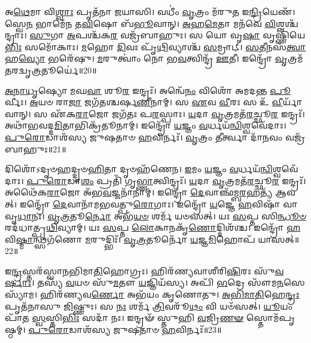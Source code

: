 𑌅\-\ul{𑌥𑍇}\-𑌮𑌾 𑌵𑌿\-\ul{𑌶𑍍𑌵𑌾𑌃} 𑌪𑍃𑌤᳴𑌨𑌾 𑌜𑌯𑌾𑌸𑌿।
𑌵𑌧𑍀𑌂॑ \ul{𑌵𑍃}\-𑌤𑍍𑌰𑌂 𑌮᳴𑌰𑍁𑌤 𑌇\-\ul{𑌨𑍍𑌦𑍍𑌰𑌿}\-𑌯𑍇𑌣᳴।
𑌸𑍍𑌵𑍇\-\ul{𑌨} 𑌭𑌾𑌮𑍇᳴𑌨 𑌤\-\ul{𑌵𑌿}\-𑌷𑍋 𑌬᳴\-\ul{𑌭𑍂}\-𑌵𑌾𑌨𑍍।
\-\ul{𑌅}\-𑌹\-\ul{𑌮𑍇}\-𑌤𑌾 𑌮𑌨᳴𑌵𑍇 \ul{𑌵𑌿}\-𑌶𑍍𑌵𑌶𑍍𑌚᳴𑌨𑍍𑌦𑍍𑌰𑌾𑌃।
\-\ul{𑌸𑍁}\-𑌗𑌾 \ul{𑌅}\-𑌪𑌶𑍍𑌚᳴𑌕\-\ul{𑌰} 𑌵𑌜𑍍𑌰᳴𑌬𑌾𑌹𑍁𑌃।
𑌸 𑌯𑍋 𑌵𑍃\-\ul{𑌷𑌾} 𑌵𑍃𑌷𑍍𑌣𑌿᳴𑌯𑍇\-\ul{𑌭𑌿𑌃} 𑌸𑌮𑍋᳴𑌕𑌾𑌃।
\-\ul{𑌮}\-𑌹𑍋 \ul{𑌦𑌿}\-𑌵𑌃 𑌪𑍃᳴\-\ul{𑌥𑌿}\-𑌵𑍍𑌯𑌾𑌶𑍍𑌚᳴ \ul{𑌸}\-𑌮𑍍𑌰𑌾𑌟𑍍।
\-\ul{𑌸}\-\-\ul{𑌤𑍀}\-𑌨𑌸᳴\-\ul{𑌤𑍍𑌵𑌾} 𑌹\-\ul{𑌵𑍍𑌯𑍋} 𑌭𑌰𑍇᳴𑌷𑍁।
\-\ul{𑌮}\-𑌰𑍁𑌤𑍍𑌵𑌾𑌂॑ 𑌨𑍋 𑌭\-\ul{𑌵}\-𑌤𑍍𑌵𑌿𑌨𑍍𑌦𑍍𑌰᳴ \ul{𑌊}\-𑌤𑍀।
𑌇𑌨𑍍𑌦𑍍𑌰𑍋᳴ \ul{𑌵𑍃}\-𑌤𑍍𑌰𑌮᳴𑌤𑌰𑌦𑍍𑌵𑍃\-\ul{𑌤𑍍𑌰}\-𑌤𑍂𑌰𑍍𑌯𑍇॑॥20॥

\-\ul{𑌅}\-\-\ul{𑌨𑌾}\-\-\ul{𑌧𑍃}\-𑌷𑍍𑌯𑍋 \ul{𑌮}\-𑌘\-\ul{𑌵𑌾} 𑌶𑍂\-\ul{𑌰} 𑌇𑌨𑍍𑌦𑍍𑌰𑌃᳴।
𑌅𑌨𑍍𑌵𑍇᳴\-\ul{𑌨𑌂} 𑌵𑌿𑌶𑍋᳴ 𑌅𑌮𑌦𑌨𑍍𑌤 \ul{𑌪𑍂}\-𑌰𑍍𑌵𑍀𑌃।
\-\ul{𑌅}\-𑌯𑍞 𑌰𑌾\-\ul{𑌜𑌾} 𑌜𑌗᳴𑌤𑌶𑍍𑌚𑌰𑍍\mbox{}𑌷\-\ul{𑌣𑍀}\-𑌨𑌾𑌮𑍍।
𑌸 \ul{𑌏}\-𑌵 \ul{𑌵𑍀}\-𑌰𑌃 𑌸 𑌉᳴ \ul{𑌵𑍀}\-𑌰𑍍𑌯𑌾᳴𑌵𑌾𑌨𑍍।
𑌸 𑌏᳴𑌕\-\ul{𑌰𑌾}\-𑌜𑍋 𑌜𑌗᳴𑌤𑌃 𑌪\-\ul{𑌰}\-𑌸𑍍𑌪𑌾𑌃।
\-\ul{𑌯}\-𑌦𑌾 \ul{𑌵𑍃}\-𑌤𑍍𑌰𑌮𑌤᳴\-\ul{𑌰}\-𑌚𑍍𑌛𑍂\-\ul{𑌰} 𑌇𑌨𑍍𑌦𑍍𑌰𑌃᳴।
𑌅𑌥𑌾᳴𑌭𑌵𑌦𑍍𑌦\-\ul{𑌮𑌿}\-𑌤𑌾𑌭𑌿𑌕𑍍𑌰᳴𑌤𑍂𑌨𑌾𑌮𑍍।
𑌇𑌨𑍍𑌦𑍍𑌰𑍋᳴ \ul{𑌯}\-𑌜𑍍𑌞𑌂 \ul{𑌵}\-𑌰𑍍𑌧𑌯᳴\-\ul{𑌨𑍍𑌵𑌿}\-𑌶𑍍𑌵𑌵𑍇᳴𑌦𑌾𑌃।
\-\ul{𑌪𑍁}\-\-\ul{𑌰𑍋}\-𑌡𑌾𑌶᳴𑌸𑍍𑌯 𑌜𑍁𑌷𑌤𑌾𑍞 \ul{𑌹}\-𑌵𑌿𑌰𑍍𑌨𑌃᳴।
\-\ul{𑌵𑍃}\-𑌤𑍍𑌰𑌂 \ul{𑌤𑍀}\-𑌰𑍍𑌤𑍍𑌵𑌾 𑌦𑌾᳴\-\ul{𑌨}\-𑌵𑌂 𑌵𑌜𑍍𑌰᳴𑌬𑌾𑌹𑍁𑌃॥21॥

𑌦𑌿𑌶𑍋᳴\-𑌽𑌦𑍃𑍞𑌹𑌦𑍍𑌦𑍃𑍞\-\ul{𑌹𑌿}\-𑌤𑌾 𑌦𑍃𑍞𑌹᳴𑌣𑍇𑌨।
\-\ul{𑌇}\-𑌮𑌂 \ul{𑌯}\-𑌜𑍍𑌞𑌂 \ul{𑌵}\-𑌰𑍍𑌧𑌯᳴\-\ul{𑌨𑍍𑌵𑌿}\-𑌶𑍍𑌵\-𑌵𑍇᳴𑌦𑌾𑌃।
\-\ul{𑌪𑍁}\-\-\ul{𑌰𑍋}\-𑌡𑌾\-\ul{𑌶𑌂} 𑌪𑍍𑌰𑌤𑌿᳴ 𑌗𑍃\-\ul{𑌭𑍍𑌣𑌾}\-𑌤𑍍𑌵𑌿𑌨𑍍𑌦𑍍𑌰𑌃᳴।
\-\ul{𑌯}\-𑌦𑌾 \ul{𑌵𑍃}\-𑌤𑍍𑌰𑌮𑌤᳴\-\ul{𑌰}\-𑌚𑍍𑌛𑍂\-\ul{𑌰} 𑌇𑌨𑍍𑌦𑍍𑌰𑌃᳴।
𑌅𑌥𑍈᳴𑌕\-\ul{𑌰𑌾}\-𑌜𑍋 𑌅᳴𑌭\-\ul{𑌵}\-𑌜𑍍𑌜𑌨𑌾᳴𑌨𑌾𑌮𑍍।
𑌇𑌨𑍍𑌦𑍍𑌰𑍋᳴ \ul{𑌦𑍇}\-𑌵𑌾𑌞𑍍𑌛᳴𑌮𑍍𑌬\-\ul{𑌰}\-𑌹𑌤𑍍𑌯᳴ 𑌆𑌵𑌤𑍍।
𑌇𑌨𑍍𑌦𑍍𑌰𑍋᳴ \ul{𑌦𑍇}\-𑌵𑌾𑌨𑌾᳴𑌮𑌭𑌵𑌤𑍍𑌪𑍁\-\ul{𑌰𑍋}\-𑌗𑌾𑌃।
𑌇𑌨𑍍𑌦𑍍𑌰𑍋᳴ \ul{𑌯}\-𑌜𑍍𑌞𑍇 \ul{𑌹}\-𑌵𑌿𑌷𑌾᳴ 𑌵𑌾𑌵𑍃\-\ul{𑌧𑌾}\-𑌨𑌃।
\-\ul{𑌵𑍃}\-\-\ul{𑌤𑍍𑌰}\-𑌤𑍂\-\ul{𑌰𑍍𑌨𑍋} 𑌅𑌭᳴\-\ul{𑌯}\-\-\ul{𑍞} 𑌶𑌰𑍍𑌮᳴ 𑌯𑍞𑌸𑌤𑍍।
𑌯𑌃 \ul{𑌸}\-𑌪𑍍𑌤 𑌸𑌿\-\ul{𑌨𑍍𑌧𑍂}\-\-\ul{𑍞} 𑌰𑌦᳴𑌧𑌾𑌤𑍍𑌪𑍃\-\ul{𑌥𑌿}\-𑌵𑍍𑌯𑌾𑌮𑍍।
𑌯𑌃 \ul{𑌸}\-𑌪𑍍𑌤 \ul{𑌲𑍋}\-𑌕𑌾𑌨𑌕𑍃᳴\-\ul{𑌣𑍋}\-𑌦𑍍𑌦𑌿𑌶᳴𑌶𑍍𑌚।
𑌇𑌨𑍍𑌦𑍍𑌰𑍋᳴ \ul{𑌹}\-𑌵𑌿\-\ul{𑌷𑍍𑌮𑌾}\-𑌨𑍍𑌥𑍍𑌸𑌗᳴𑌣𑍋 \ul{𑌮}\-𑌰𑍁𑌦𑍍𑌭𑌿𑌃᳴।
\-\ul{𑌵𑍃}\-\-\ul{𑌤𑍍𑌰}\-𑌤𑍂𑌰𑍍𑌨𑍋᳴ \ul{𑌯}\-𑌜𑍍𑌞\-\ul{𑌮𑌿}\-𑌹𑍋𑌪᳴ 𑌯𑌾𑌸𑌤𑍍॥22॥\anuvakamend[\-\ul{𑌵}\-\-\ul{𑌵}\-\-\ul{𑌰𑍍𑌥} \ul{𑌵𑌿}\-\-\ul{𑌥𑍍𑌸} 𑌇𑌨𑍍𑌦𑍍𑌰᳴\-\ul{𑌸𑍍𑌤𑍁}\-𑌰𑌾𑌯𑌾॑𑌸𑍍𑌤𑍁 𑌵𑍃\-\ul{𑌤𑍍𑌰}\-𑌤𑍂\-\ul{𑌰𑍍𑌯𑍇} 𑌵𑌜𑍍𑌰᳴𑌬𑌾𑌹𑍁𑌃 𑌪𑍃\-\ul{𑌥𑌿}\-𑌵𑍍𑌯𑌾𑌨𑍍𑌤𑍍𑌰𑍀𑌣𑌿᳴ 𑌚]

𑌇\-\ul{𑌨𑍍𑌦𑍍𑌰}\-𑌸𑍍𑌤𑌰᳴𑌸𑍍𑌵𑌾𑌨𑌭𑌿𑌮𑌾\-\ul{𑌤𑌿}\-𑌹𑍋𑌗𑍍𑌰𑌃।
𑌹𑌿𑌰᳴𑌣𑍍𑌯𑌵𑌾𑌶𑍀𑌰𑌿\-\ul{𑌷𑌿}\-𑌰𑌃 𑌸𑍁᳴\-\ul{𑌵}\-\-\ul{𑌰𑍍}\-𑌷𑌾𑌃।
𑌤𑌸𑍍𑌯᳴ \ul{𑌵}\-𑌯𑍞 𑌸𑍁᳴\-\ul{𑌮}\-𑌤𑍗 \ul{𑌯}\-𑌜𑍍𑌞𑌿𑌯᳴𑌸𑍍𑌯।
𑌅𑌪𑌿᳴ \ul{𑌭}\-𑌦𑍍𑌰𑍇 𑌸𑍗᳴𑌮\-\ul{𑌨}\-𑌸𑍇 𑌸𑍍𑌯𑌾᳴𑌮।
𑌹𑌿𑌰᳴𑌣𑍍𑌯𑌵\-\ul{𑌰𑍍𑌣𑍋} 𑌅𑌭᳴𑌯𑌂 𑌕𑍃𑌣𑍋𑌤𑍁।
\-\ul{𑌅}\-\-\ul{𑌭𑌿}\-\-\ul{𑌮𑌾}\-\-\ul{𑌤𑌿}\-𑌹𑍇\-\ul{𑌨𑍍𑌦𑍍𑌰𑌃} 𑌪𑍃𑌤᳴𑌨𑌾𑌸𑍁 \ul{𑌜𑌿}\-𑌷𑍍𑌣𑍁𑌃।
𑌸 \ul{𑌨𑌃} 𑌶𑌰𑍍𑌮᳴ \ul{𑌤𑍍𑌰𑌿}\-𑌵𑌰𑍂᳴\-\ul{𑌥𑌂} 𑌵𑌿 𑌯𑍞᳴𑌸𑌤𑍍।
\-\ul{𑌯𑍂}\-𑌯𑌂 𑌪𑌾᳴𑌤 \ul{𑌸𑍍𑌵}\-𑌸𑍍𑌤𑌿\-\ul{𑌭𑌿𑌃} 𑌸𑌦𑌾᳴ 𑌨𑌃।
𑌇𑌨𑍍𑌦𑍍𑌰𑍟᳴ 𑌸𑍍𑌤𑍁𑌹𑌿 \ul{𑌵}\-𑌜𑍍𑌰𑌿\-\ul{𑌣}\-\-\ul{𑍟} 𑌸𑍍𑌤𑍋𑌮᳴𑌪𑍃𑌷𑍍𑌠𑌮𑍍।
\-\ul{𑌪𑍁}\-\-\ul{𑌰𑍋}\-𑌡𑌾𑌶᳴𑌸𑍍𑌯 𑌜𑍁𑌷𑌤𑌾𑍞 \ul{𑌹}\-𑌵𑌿𑌰𑍍𑌨𑌃᳴॥23॥

